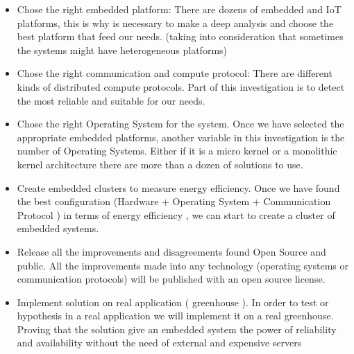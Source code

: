 \begin{itemize}

\item Chose the right embedded platform: There are dozens of embedded and IoT
platforms, this is why is necessary to make a deep analysis and choose the best
platform that feed our needs. (taking into consideration that sometimes the
systems might have heterogeneous platforms)

\item Chose the right communication and compute protocol: There are different
kinds of distributed compute protocols. Part of this investigation is to detect
the most reliable and suitable for our needs.

\item Chose the right Operating System for the system. Once we have selected
the appropriate embedded platforms, another variable in this investigation is
the number of Operating Systems. Either if it is a micro kernel or a monolithic
kernel architecture there are more than a dozen of solutions to use.

\item Create embedded clusters to measure energy efficiency. Once we have found
the best configuration (Hardware + Operating System + Communication Protocol )
in terms of energy efficiency , we can start to create a cluster of embedded
systems.

\item Release all the improvements and disagreements found Open Source and
public. All the improvements made into any technology (operating systems or
communication protocols) will be published with an open source license.

\item Implement solution on real application ( greenhouse ). In order to test
or hypothesis in a real application we will implement it on a real greenhouse.
Proving that the solution give an embedded system the power of reliability and
availability without the need of external and expensive servers 
\end{itemize}


\clearpage
